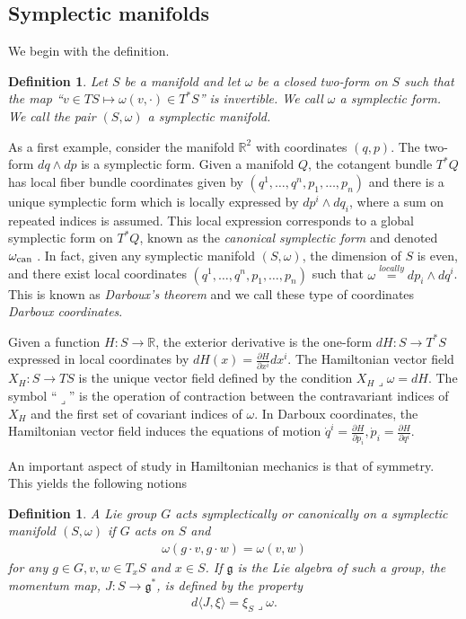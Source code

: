 \documentclass[12pt]{amsart}
\newcommand{\pder}[2]{\ensuremath{\frac{\partial #1}{\partial #2}}}
\newcommand{\R}{\ensuremath{\mathbb{R}}}
\newtheorem{defn}[thm]{Definition}
\begin{document}
\subsection{Symplectic manifolds}
\label{sec:Symplectic}
We begin with the definition.
\begin{defn}
  Let $S$ be a manifold
  and let $\omega$ be a closed two-form on $S$ such that the map
  ``$v \in TS \mapsto \omega( v , \cdot ) \in T^*S$'' is invertible.
  We call $\omega$ a \emph{symplectic form}.
  We call the pair $(S,\omega)$ a \emph{symplectic manifold}.
\end{defn}
As a first example, consider the manifold $\R^2$
with coordinates $(q,p)$.
The two-form $dq \wedge dp$ is a symplectic form.
Given a manifold $Q$,
the cotangent bundle $T^*Q$ has local fiber bundle coordinates
given by $(q^1,\dots, q^n,p_1,\dots,p_n)$ and there is a unique symplectic form
which is locally expressed by $dp^i \wedge dq_i$, where
a sum on repeated indices is assumed.
This local expression corresponds to a global symplectic
form on $T^*Q$, known as the \emph{canonical symplectic form}
and denoted $\omega_{\rm can}$ \cite[Theorem 3.2.10]{FOM}.
In fact, given any symplectic manifold $(S,\omega)$, the dimension of $S$
is even, and there exist local coordinates $(q^1,\dots,q^n,p_1,\dots,p_n)$
such that $\omega \stackrel{locally}{=} dp_i \wedge dq^i$.
This is known as \emph{Darboux's theorem} and we call these type of
coordinates \emph{Darboux coordinates}\cite[Theorem 3.2.2]{FOM}.

Given a function $H:S \to \mathbb{R}$,
the exterior derivative is the one-form $dH:S \to T^*S$
expressed in local coordinates by $dH(x) = \pder{H}{x^i} dx^i$.
The Hamiltonian vector field $X_H:S \to TS$ is the unique vector
field defined by the condition
$
  X_H \lrcorner \omega = dH.
$
The symbol ``$\lrcorner$'' is the operation of contraction between
the contravariant indices of $X_H$ and the first set of covariant
indices of $\omega$.
In Darboux coordinates, the Hamiltonian vector field induces the
equations of motion $\dot{q}^i = \pder{H}{p_i}, \dot{p}_i = \pder{H}{q^i}$.


An important aspect of study in Hamiltonian mechanics is that of symmetry.
This yields the following notions

\begin{defn}
  A Lie group $G$ \emph{acts symplectically} or \emph{canonically} on a symplectic manifold $(S,\omega)$ if $G$ acts on $S$ and
  \begin{align*}
    \omega( g \cdot v , g \cdot w) = \omega(v,w)
  \end{align*}
  for any $g \in G, v,w \in T_xS$ and $x \in S$.
  If $\mathfrak{g}$ is the Lie algebra of such a group,
  the \emph{momentum map}, $J:S \to \mathfrak{g}^*$,
  is defined by the property
  \begin{align*}
    d \langle J , \xi \rangle = \xi_S \lrcorner \omega.
  \end{align*}
\end{defn}
\end{document}
